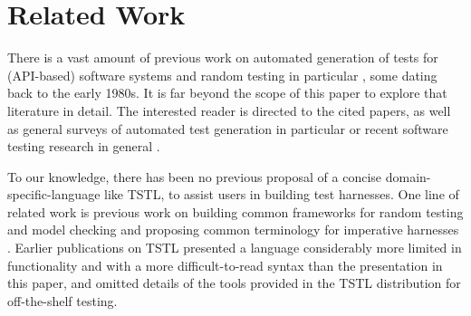 \section{Related Work}

There is a vast amount of previous work on automated generation of
tests for (API-based) software systems
\cite{Pacheco,FA11,GodefroidKS05} and random testing in particular
\cite{ICSEDiff,Pacheco,AMFL11,ARTChen,ISSTAART,FASE,HamletOnly,Hamlet94,ClaessenH00,CiupaLOM07,RandFormal,woda08,andrews-etal-rute-rt,ASE08,evalrand,csmith},
some dating back to the early 1980s. It is far beyond the scope of
this paper to explore that literature in detail.  The interested
reader is directed to the cited papers, as well as general surveys of
automated test generation in particular \cite{anand2013orchestrated}
or recent software testing research in general \cite{orsofuse}.  



To our knowledge, there has been no previous proposal of a concise
domain-specific-language \cite{Fow10} like TSTL, to assist users in building test
harnesses.  One line of related work is previous work on
building common frameworks for random testing and model checking
\cite{woda08} and proposing common terminology for imperative
harnesses \cite{woda12}.  Earlier publications on TSTL \cite{NFM15,ISSTA15} presented a
language considerably more limited in functionality and with a more
difficult-to-read syntax than the presentation in this paper, and
omitted details of the tools provided in the TSTL distribution for
off-the-shelf testing.

